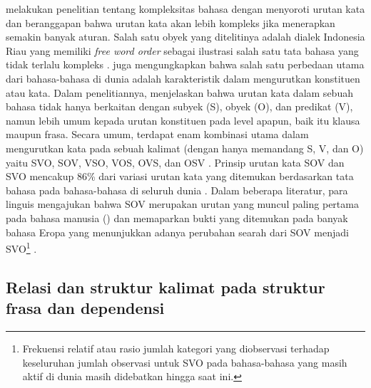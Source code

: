 \cite{gil2001creoles} melakukan penelitian tentang kompleksitas bahasa dengan menyoroti urutan kata dan beranggapan bahwa urutan kata akan lebih kompleks jika menerapkan semakin banyak aturan. Salah satu obyek yang ditelitinya adalah dialek Indonesia Riau yang memiliki \textit{free word order} sebagai ilustrasi salah satu tata bahasa yang tidak terlalu kompleks \citep{gil2001creoles}. \cite{dryer2007word} juga mengungkapkan bahwa salah satu perbedaan utama dari bahasa-bahasa di dunia adalah karakteristik dalam mengurutkan konstituen atau kata. Dalam penelitiannya, \cite{dryer2007word} menjelaskan bahwa urutan kata dalam sebuah bahasa tidak hanya berkaitan dengan subyek (S), obyek (O), dan predikat (V), namun lebih umum kepada urutan konstituen pada level apapun, baik itu klausa maupun frasa. Secara umum, terdapat enam kombinasi utama dalam mengurutkan kata pada sebuah kalimat (dengan hanya memandang S, V, dan O) yaitu SVO, SOV, VSO, VOS, OVS, dan OSV \citep{dryer2007word}. Prinsip urutan kata SOV dan SVO mencakup 86\% dari variasi urutan kata yang ditemukan berdasarkan tata bahasa pada bahasa-bahasa di seluruh dunia \citep{dryer2005world}. Dalam beberapa literatur, para linguis mengajukan bahwa SOV merupakan urutan yang muncul paling pertama pada bahasa manusia (\citealp{givon1979syntax, gell2011origin, newmeyer2000language}) dan memaparkan bukti yang ditemukan pada banyak bahasa Eropa yang menunjukkan adanya perubahan searah dari SOV menjadi SVO\footnote{Frekuensi relatif atau rasio jumlah kategori yang diobservasi terhadap keseluruhan jumlah observasi untuk SVO pada bahasa-bahasa yang masih aktif di dunia masih didebatkan hingga saat ini.} \citep{newmeyer2000language}. 
 
\subsection{Relasi dan struktur kalimat pada struktur frasa dan dependensi}


